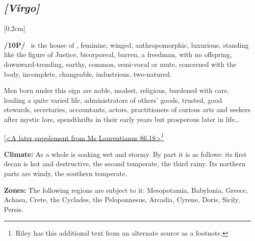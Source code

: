 \secbr
\subsection{\textit{[Virgo]}}
[0.2cm]

\textbf{/10P/}  \Virgo\, is the house of \Mercury,  feminine, winged, anthropomorphic, luxurious, standing like the figure of Justice,  bicorporeal, barren, a freedman, with no offspring, downward-trending,  earthy,  common,  semi-vocal or  mute, concerned with the body, incomplete, changeable, industrious,  two-natured. 

Men born under this sign are noble, modest, religious, burdened with care, leading a quite varied life, administrators of others’ goods, trusted, good stewards, secretaries, accountants, actors, practitioners of curious arts and seekers after mystic lore, spendthrifts in their early years but prosperous later in life\ldots 

\noindent
[\underline{<A later supplement from Ms Laurentianus 86.18>}\footnote{Riley has this additional text from an alternate source as a footnote.} 

\textbf{Climate:} As a whole \Virgo is soaking wet and stormy. By part it is as follows: its first decan is hot and destructive, the second temperate, the third rainy. Its northern parts are windy, the southern temperate. 

\textbf{Zones:} The following regions are subject to it: Mesopotamia, Babylonia, Greece, Achaea, Crete, the Cyclades, the Peloponnesus, Arcadia, Cyrene, Doris, Sicily, Persis. 

